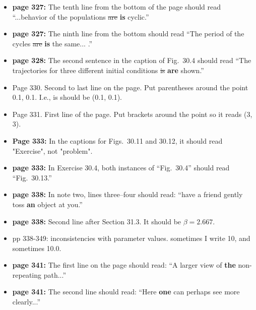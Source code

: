 \documentclass[12pt]{article}
\begin{document}
\begin{itemize}
  \item {\bf page 327:}  The tenth line from the bottom of the page
    should read ``...behavior of the populations \sout{are} {\bf is}
    cyclic.'' 

  \item {\bf page 327:}  The ninth line from the bottom should read
    ``The period of the cycles \sout{are} {\bf is} the same... .''

  \item {\bf page 328:}  The second sentence in the caption of
    Fig.~30.4 should read ``The trajectories for three different
    initial conditions \sout{is} {\bf are} shown.'' 

  \item Page 330.  Second to last line on the page.  Put parentheses
   around the point 0.1, 0.1.  I.e., is should be (0.1, 0.1).

  \item Page 331.  First line of the page.  Put brackets around the point
   so it reads (3, 3). 

   \item {\bf Page 333:}  In the captions for Figs.~30.11 and 30.12, it 
   should read "Exercise", not "problem".

  \item {\bf page 333:}  In Exercise 30.4, both instances of
    ``Fig.~30.4'' should read ``Fig.~30.13.''

  \item {\bf page 338:}  In note two, lines three--four should read:
    ``have a friend gently toss {\bf an} object at you.'' %

  \item {\bf page 338:}  Second line after Section 31.3.  It should be
    $\beta = 2.667$.

  \item pp 338-349:  inconsistencies with parameter values.  sometimes
    I  write 10, and sometimes 10.0.   

  \item {\bf page 341:}  The first line on the page should read: ``A
    larger view of {\bf the} non-repeating path...'' %
  
  \item {\bf page 341:}  The second line should read: ``Here {\bf one}
    can perhaps see more clearly...'' %


\end{itemize}
\end{document}
